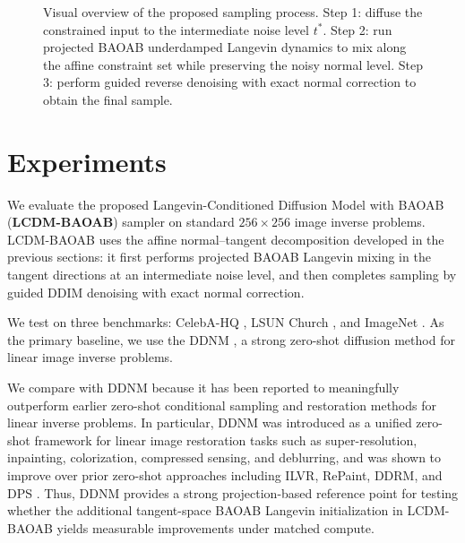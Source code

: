 \documentclass[twoside,11pt]{article}
\numberwithin{equation}{section}
\begin{document}
\begin{figure}[ht]
  \caption{Visual overview of the proposed sampling process. Step 1: diffuse the constrained input to the intermediate noise level \(t^*\). Step 2: run projected BAOAB underdamped Langevin dynamics to mix along the affine constraint set while preserving the noisy normal level. Step 3: perform guided reverse denoising with exact normal correction to obtain the final sample.}
  \label{fig:diffusion-process-overview}
\end{figure}

\section{Experiments}
\label{sec:experiments}

We evaluate the proposed Langevin-Conditioned Diffusion Model with BAOAB (\textbf{LCDM-BAOAB}) sampler on standard
\(256\times256\) image inverse problems. LCDM-BAOAB uses the affine
normal--tangent decomposition developed in the previous sections: it first
performs projected BAOAB Langevin mixing in the tangent directions at an
intermediate noise level, and then completes sampling by guided DDIM denoising
with exact normal correction.

We test on three benchmarks: CelebA-HQ \citep{karras2017progressive},
LSUN Church \citep{yu2015lsun}, and ImageNet \citep{deng2009imagenet}. As the
primary baseline, we use the 
DDNM \citep{wang2022ddnm}, a strong zero-shot diffusion method for linear
image inverse problems.

We compare with DDNM because it has been reported to meaningfully outperform
earlier zero-shot conditional sampling and restoration methods for linear
inverse problems. In particular, DDNM was introduced as a unified zero-shot
framework for linear image restoration tasks such as super-resolution,
inpainting, colorization, compressed sensing, and deblurring, and was shown to
improve over prior zero-shot approaches including ILVR, RePaint, DDRM, and DPS
\citep{choi2021ilvr,lugmayr2022repaint,kawar2022ddrm,wang2022ddnm, chung2023dps}. Thus, DDNM
provides a strong projection-based reference point for testing whether the
additional tangent-space BAOAB Langevin initialization in LCDM-BAOAB yields
measurable improvements under matched compute.
\end{document}
